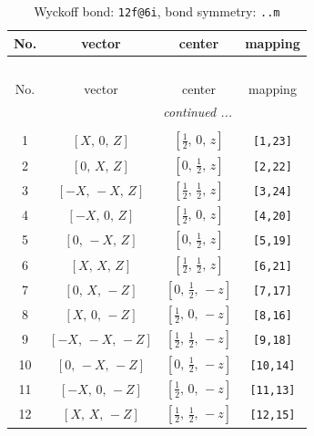 \documentclass[fleqn,8pt]{jsarticle}
\begin{document}
\renewcommand{\arraystretch}{1.2}
\begin{longtable}{cccc}
\caption{Wyckoff bond: {\tt 12f@6i}, bond symmetry: {\tt ..m}}
 \\
 \hline \hline
No. & vector & center & mapping \\ \hline \endfirsthead

\multicolumn{3}{l}{\tablename\ \thetable{}} \\
 \hline \hline
No. & vector & center & mapping \\ \hline \endhead

 \hline \hline
\multicolumn{3}{r}{\footnotesize\it continued ...} \\ \endfoot

 \hline \hline
\multicolumn{3}{r}{} \\ \endlastfoot

1 & $\left[ X,\, 0,\, Z \right]$ & $\left[ \frac{1}{2},\, 0,\, z \right]$ & {\tt [1,23]} \\ \hline
2 & $\left[ 0,\, X,\, Z \right]$ & $\left[ 0,\, \frac{1}{2},\, z \right]$ & {\tt [2,22]} \\ \hline
3 & $\left[ - X,\, - X,\, Z \right]$ & $\left[ \frac{1}{2},\, \frac{1}{2},\, z \right]$ & {\tt [3,24]} \\ \hline
4 & $\left[ - X,\, 0,\, Z \right]$ & $\left[ \frac{1}{2},\, 0,\, z \right]$ & {\tt [4,20]} \\ \hline
5 & $\left[ 0,\, - X,\, Z \right]$ & $\left[ 0,\, \frac{1}{2},\, z \right]$ & {\tt [5,19]} \\ \hline
6 & $\left[ X,\, X,\, Z \right]$ & $\left[ \frac{1}{2},\, \frac{1}{2},\, z \right]$ & {\tt [6,21]} \\ \hline
7 & $\left[ 0,\, X,\, - Z \right]$ & $\left[ 0,\, \frac{1}{2},\, - z \right]$ & {\tt [7,17]} \\ \hline
8 & $\left[ X,\, 0,\, - Z \right]$ & $\left[ \frac{1}{2},\, 0,\, - z \right]$ & {\tt [8,16]} \\ \hline
9 & $\left[ - X,\, - X,\, - Z \right]$ & $\left[ \frac{1}{2},\, \frac{1}{2},\, - z \right]$ & {\tt [9,18]} \\ \hline
10 & $\left[ 0,\, - X,\, - Z \right]$ & $\left[ 0,\, \frac{1}{2},\, - z \right]$ & {\tt [10,14]} \\ \hline
11 & $\left[ - X,\, 0,\, - Z \right]$ & $\left[ \frac{1}{2},\, 0,\, - z \right]$ & {\tt [11,13]} \\ \hline
12 & $\left[ X,\, X,\, - Z \right]$ & $\left[ \frac{1}{2},\, \frac{1}{2},\, - z \right]$ & {\tt [12,15]} \\
\end{longtable}
\end{document}
